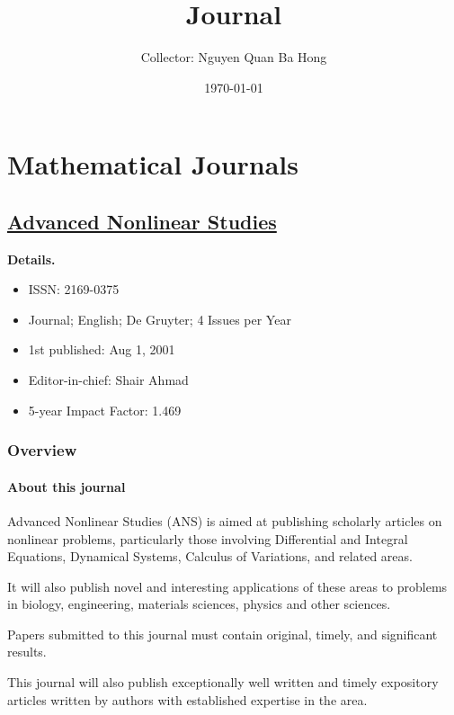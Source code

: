 \documentclass{book}
\title{Journal}
\author{Collector: Nguyen Quan Ba Hong}
\date{\today}
\numberwithin{equation}{section}
\begin{document}
\maketitle
\setcounter{secnumdepth}{6}
\setcounter{tocdepth}{6}
\tableofcontents


\part{Mathematical Journals}

\chapter{\href{https://www.degruyter.com/journal/key/ANS/html}{Advanced Nonlinear Studies}}

\textbf{Details.}
\begin{itemize}
    \item ISSN: 2169-0375
    \item Journal; English; De Gruyter; 4 Issues per Year
    \item 1st published: Aug 1, 2001
    \item Editor-in-chief: Shair Ahmad
    \item 5-year Impact Factor: 1.469
\end{itemize}

\section{Overview}

\subsection{About this journal}
Advanced Nonlinear Studies (ANS) is aimed at publishing scholarly articles on nonlinear problems, particularly those involving Differential and Integral Equations, Dynamical Systems, Calculus of Variations, and related areas.

It will also publish novel and interesting applications of these areas to problems in biology, engineering, materials sciences, physics and other sciences.

Papers submitted to this journal must contain original, timely, and significant results.

This journal will also publish exceptionally well written and timely expository articles written by authors with established expertise in the area.
\end{document}
